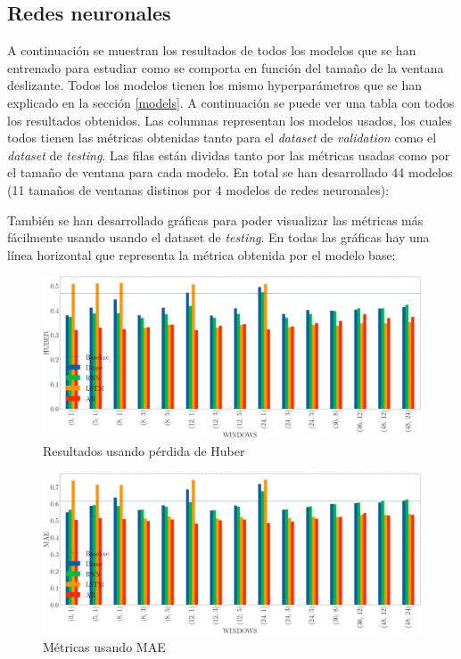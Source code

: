 \subsection{Redes neuronales}

A continuación se muestran los resultados de todos los modelos que se han entrenado para estudiar como se comporta en función del tamaño de la ventana deslizante. Todos los modelos tienen los mismo hyperparámetros que se han explicado en la sección \ref{models}. A continuación se puede ver una tabla con todos los resultados obtenidos. Las columnas representan los modelos usados, los cuales todos tienen las métricas obtenidas tanto para el \textit{dataset} de \textit{validation} como el \textit{dataset} de \textit{testing}. Las filas están dividas tanto por las métricas usadas como por el tamaño de ventana para cada modelo. En total se han desarrollado 44 modelos (11 tamaños de ventanas distinos por 4 modelos de redes neuronales):



También se han desarrollado gráficas para poder visualizar las métricas más fácilmente usando usando el dataset de \textit{testing}. En todas las gráficas hay una línea horizontal que representa la métrica obtenida por el modelo base:



\begin{figure}[H]
    \centering
    \includegraphics[width=15cm]{images/solution/metrics/HUBER.png}
    \caption{Resultados usando pérdida de Huber}
\end{figure}

\begin{figure}[H]
    \centering
    \includegraphics[width=15cm]{images/solution/metrics/MAE.png}
    \caption{Métricas usando MAE}
\end{figure}

